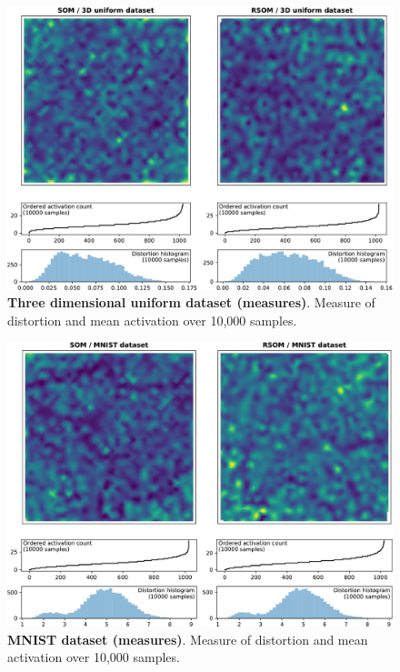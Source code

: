 \begin{figure}
  \includegraphics[width=\columnwidth]{experiment-3D-uniform-activation-distortion.pdf}
  \caption{\textbf{Three dimensional uniform dataset (measures)}. Measure of distortion and mean activation over 10,000 samples.}%
\end{figure}

\begin{figure}
  \includegraphics[width=\columnwidth]{experiment-MNIST-activation-distortion.pdf}
  \caption{\textbf{MNIST dataset (measures)}. Measure of distortion and mean activation over 10,000 samples.}%
\end{figure}

